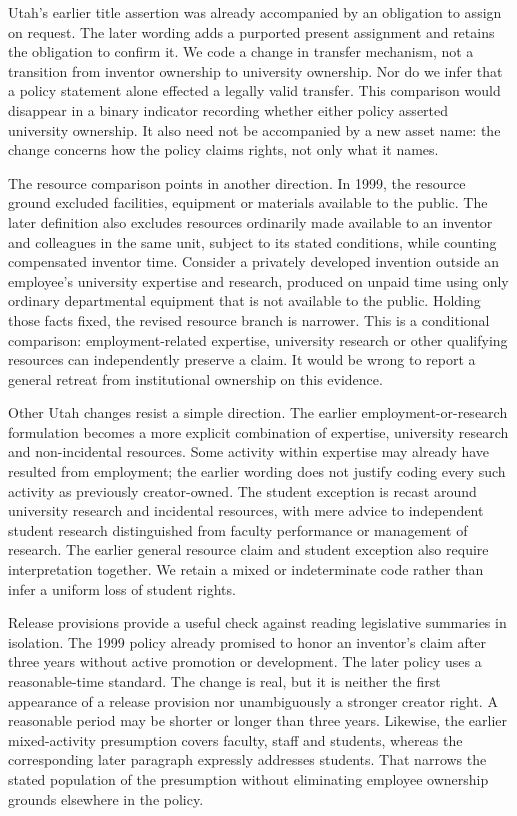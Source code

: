 \documentclass[12pt]{article}
\begin{document}
Utah's earlier title assertion was already accompanied by an obligation to assign on request. The later wording adds a purported present assignment and retains the obligation to confirm it. We code a change in transfer mechanism, not a transition from inventor ownership to university ownership. Nor do we infer that a policy statement alone effected a legally valid transfer. This comparison would disappear in a binary indicator recording whether either policy asserted university ownership. It also need not be accompanied by a new asset name: the change concerns how the policy claims rights, not only what it names.

The resource comparison points in another direction. In 1999, the resource ground excluded facilities, equipment or materials available to the public. The later definition also excludes resources ordinarily made available to an inventor and colleagues in the same unit, subject to its stated conditions, while counting compensated inventor time. Consider a privately developed invention outside an employee's university expertise and research, produced on unpaid time using only ordinary departmental equipment that is not available to the public. Holding those facts fixed, the revised resource branch is narrower. This is a conditional comparison: employment-related expertise, university research or other qualifying resources can independently preserve a claim. It would be wrong to report a general retreat from institutional ownership on this evidence.

Other Utah changes resist a simple direction. The earlier employment-or-research formulation becomes a more explicit combination of expertise, university research and non-incidental resources. Some activity within expertise may already have resulted from employment; the earlier wording does not justify coding every such activity as previously creator-owned. The student exception is recast around university research and incidental resources, with mere advice to independent student research distinguished from faculty performance or management of research. The earlier general resource claim and student exception also require interpretation together. We retain a mixed or indeterminate code rather than infer a uniform loss of student rights.

Release provisions provide a useful check against reading legislative summaries in isolation. The 1999 policy already promised to honor an inventor's claim after three years without active promotion or development. The later policy uses a reasonable-time standard. The change is real, but it is neither the first appearance of a release provision nor unambiguously a stronger creator right. A reasonable period may be shorter or longer than three years. Likewise, the earlier mixed-activity presumption covers faculty, staff and students, whereas the corresponding later paragraph expressly addresses students. That narrows the stated population of the presumption without eliminating employee ownership grounds elsewhere in the policy.
\end{document}
